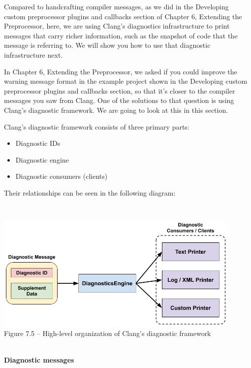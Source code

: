 Compared to handcrafting compiler messages, as we did in the Developing custom preprocessor plugins and callbacks section of Chapter 6, Extending the Preprocessor, here, we are using Clang's diagnostics infrastructure to print messages that carry richer information, such as the snapshot of code that the message is referring to. We will show you how to use that diagnostic infrastructure next.


In Chapter 6, Extending the Preprocessor, we asked if you could improve the warning message format in the example project shown in the Developing custom preprocessor plugins and callbacks section, so that it's closer to the compiler messages you saw from Clang. One of the solutions to that question is using Clang's diagnostic framework. We are going to look at this in this section.

Clang's diagnostic framework consists of three primary parts:

\begin{itemize}
\item Diagnostic IDs
\item Diagnostic engine
\item Diagnostic consumers (clients)
\end{itemize}

Their relationships can be seen in the following diagram:

\hspace*{\fill} \\ %
\begin{center}
\includegraphics[width=0.9\textwidth]{content/2/chapter7/images/5.png}\\
Figure 7.5 – High-level organization of Clang's diagnostic framework
\end{center}

\hspace*{\fill} \\ %
\noindent
\textbf{Diagnostic messages}

